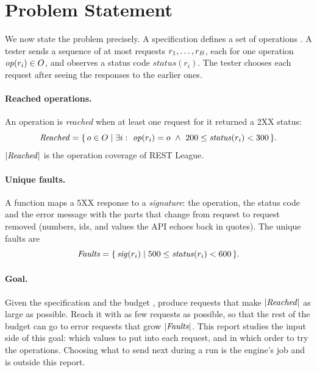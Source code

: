 \section{Problem Statement}
\label{sec:problem}

We now state the problem precisely. A specification defines a set of
operations \Ops. A tester sends a sequence of at most \Budget requests
$r_1, \dots, r_{B}$, each for one operation $\mathit{op}(r_i) \in O$,
and observes a status code $\mathit{status}(r_i)$. The tester chooses each
request after seeing the responses to the earlier ones.

\paragraph{Reached operations.} An operation is \emph{reached} when at least
one request for it returned a 2XX status:
\begin{equation}
  \mathit{Reached} = \{\, o \in O \mid \exists i:\ \mathit{op}(r_i) = o \ \wedge\
  200 \le \mathit{status}(r_i) < 300 \,\}.
  \label{eq:reached}
\end{equation}
$|\mathit{Reached}|$ is the operation coverage of REST League.

\paragraph{Unique faults.} A function \sig maps a 5XX response to a
\emph{signature}: the operation, the status code and the error message with
the parts that change from request to request removed (numbers, ids, and
values the API echoes back in quotes). The unique faults are
\begin{equation}
  \mathit{Faults} = \{\, \mathit{sig}(r_i) \mid 500 \le \mathit{status}(r_i) < 600 \,\}.
  \label{eq:faults}
\end{equation}

\paragraph{Goal.} Given the specification and the budget \Budget, produce
requests that make $|\mathit{Reached}|$ as large as possible. Reach it with as few
requests as possible, so that the rest of the budget can go to error
requests that grow $|\mathit{Faults}|$. This report studies the input side of this
goal: which values to put into each request, and in which order to try the
operations. Choosing what to send next during a run is the engine's job and
is outside this report.

